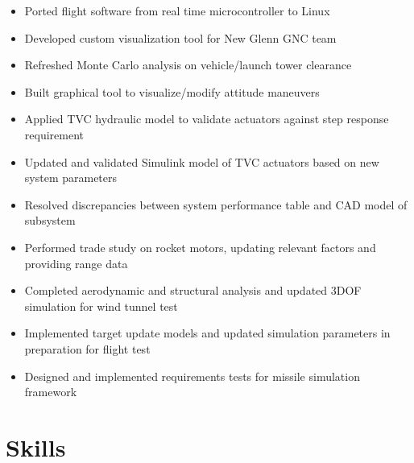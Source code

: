 \documentclass{resume}
\begin{document}
\begin{itemize}
    \item Ported flight software from real time microcontroller to Linux
    \item Developed custom visualization tool for New Glenn GNC team
    \item Refreshed Monte Carlo analysis on vehicle/launch tower clearance
    \item Built graphical tool to visualize/modify attitude maneuvers
\end{itemize}
\begin{itemize}
    \item Applied TVC hydraulic model to validate actuators against step response requirement
    \item Updated and validated Simulink model of TVC actuators based on new system parameters
    \item Resolved discrepancies between system performance table and CAD model of subsystem
\end{itemize}
\begin{itemize}
    \item Performed trade study on rocket motors, updating relevant factors and providing range data
    \item Completed aerodynamic and structural analysis and updated 3DOF simulation for wind tunnel test
    \item Implemented target update models and updated simulation parameters in preparation for flight test
    \item Designed and implemented requirements tests for missile simulation framework
\end{itemize}

\section{Skills}
\begin{itemize}
\end{itemize}
\begin{itemize}
\end{itemize}
\end{document}
